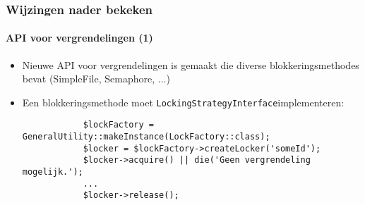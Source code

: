 \begin{frame}[fragile]
	\frametitle{Wijzingen nader bekeken}
	\framesubtitle{API voor vergrendelingen (1)}

	\begin{itemize}

		\item Nieuwe API voor vergrendelingen is gemaakt die diverse blokkeringsmethodes bevat (SimpleFile, Semaphore, ...)
		\item Een blokkeringsmethode moet \small\texttt{LockingStrategyInterface}\normalsize implementeren:
		\begin{lstlisting}
			$lockFactory = GeneralUtility::makeInstance(LockFactory::class);
			$locker = $lockFactory->createLocker('someId');
			$locker->acquire() || die('Geen vergrendeling mogelijk.');
			...
			$locker->release();
		\end{lstlisting}

	\end{itemize}

\end{frame}

